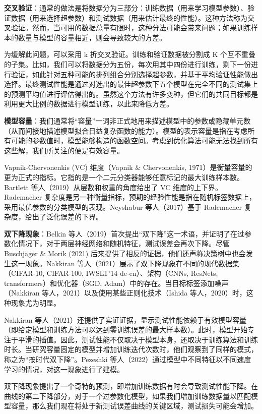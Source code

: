 \textbf{交叉验证}：通常的做法是将数据分为三部分：训练数据（用来学习模型参数）、验证数据（用来选择超参数）和测试数据（用来估计最终的性能）。这种方法称为交叉验证。然而，当可用的数据总量有限时，这种分法可能会带来问题；如果训练样本的数量与模型的容量相近，则会导致较大的方差。

为缓解此问题，可以采用 k 折交叉验证。训练和验证数据被分割成 K 个互不重叠的子集。比如，我们可以将数据分为五份，每次用其中四份进行训练，剩下一份进行验证，如此针对五种可能的排列组合分别选择超参数，并基于平均验证性能做出选择。最终测试性能是通过对选出的最佳超参数下五个模型在完全不同的测试集上的预测平均值进行评估得出的。虽然这个方法有许多变种，但它们的共同目标都是利用更大比例的数据进行模型训练，以此来降低方差。

\textbf{模型容量}：我们通常将“容量”一词非正式地用来描述模型中的参数或隐藏单元数（从而间接地描述模型拟合日益复杂函数的能力）。模型的表示容量是指在考虑所有可能的参数值时，模型能够构造的函数空间。考虑到优化算法可能无法找到所有这些解，我们所关注的便是有效容量。

Vapnik-Chervonenkis (VC) 维度（Vapnik \& Chervonenkis, 1971）是衡量容量的更为正式的指标。它指的是一个二元分类器能够任意标记的最大训练样本数。Bartlett 等人（2019）从层数和权重的角度给出了 VC 维度的上下界。Rademacher 复杂度是另一种衡量指标，预期的经验性能是指在随机标签数据上，采用最优参数的分类模型的表现。Neyshabur 等人（2017）基于 Rademacher 复杂度，给出了泛化误差的下界。

\textbf{双下降现象}：Belkin 等人（2019）首次提出“双下降”这一术语，并证明了在过参数化情况下，对于两层神经网络和随机特征，测试误差会再次下降。尽管 Buschjäger \& Morik (2021) 后来提供了相反的证据，他们还声称决策树中也会发生这一现象。Nakkiran 等人（2021）展示了双下降现象在不同的现代数据集（CIFAR-10, CIFAR-100, IWSLT’14 de-en）、架构（CNNs, ResNets, transformers）和优化器（SGD, Adam）中的存在。当目标标签添加噪声（Nakkiran 等人，2021）以及使用某些正则化技术（Ishida 等人，2020）时，这种现象尤为明显。

Nakkiran 等人（2021）还提供了实证证据，显示测试性能依赖于有效模型容量（即给定模型和训练方法可以达到零训练误差的最大样本数）。此时，模型开始专注于平滑的插值。因此，测试性能不仅取决于模型本身，还取决于训练算法和训练时长。当研究容量固定的模型并增加训练迭代次数时，他们观察到了同样的模式，称之为“按时代双下降”。Pezeshki 等人（2022）通过模型中不同特征以不同速度学习的情况，对这一现象进行了建模。

双下降现象提出了一个奇特的预测，即增加训练数据有时会导致测试性能下降。在曲线的第二下降部分，对于一个过参数化模型，如果我们增加训练数据量以匹配模型容量，那么我们现在将处于新测试误差曲线的关键区域，测试损失可能会增加。

